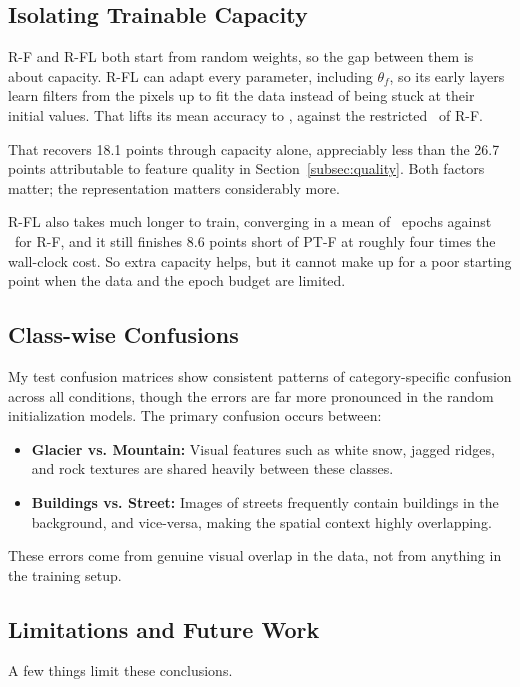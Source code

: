 \documentclass[conference]{IEEEtran}
\begin{document}
\subsection{Isolating Trainable Capacity}
R-F and R-FL both start from random weights, so the gap between them is about capacity. R-FL can adapt every parameter, including $\theta_f$, so its early layers learn filters from the pixels up to fit the data instead of being stuck at their initial values. That lifts its mean accuracy to \randomfullTestAccMean, against the restricted \randomfrozenTestAccMean\ of R-F.

That recovers 18.1 points through capacity alone, appreciably less than the 26.7 points attributable to feature quality in Section~\ref{subsec:quality}. Both factors matter; the representation matters considerably more.

R-FL also takes much longer to train, converging in a mean of \randomfullValEpochsMean\ epochs against \randomfrozenValEpochsMean\ for R-F, and it still finishes 8.6 points short of PT-F at roughly four times the wall-clock cost. So extra capacity helps, but it cannot make up for a poor starting point when the data and the epoch budget are limited.

\subsection{Class-wise Confusions}
My test confusion matrices show consistent patterns of category-specific confusion across all conditions, though the errors are far more pronounced in the random initialization models. 
The primary confusion occurs between:
\begin{itemize}
    \item \textbf{Glacier vs. Mountain:} Visual features such as white snow, jagged ridges, and rock textures are shared heavily between these classes.
    \item \textbf{Buildings vs. Street:} Images of streets frequently contain buildings in the background, and vice-versa, making the spatial context highly overlapping.
\end{itemize}
These errors come from genuine visual overlap in the data, not from anything in the training setup.

\subsection{Limitations and Future Work}
A few things limit these conclusions.
\end{document}
